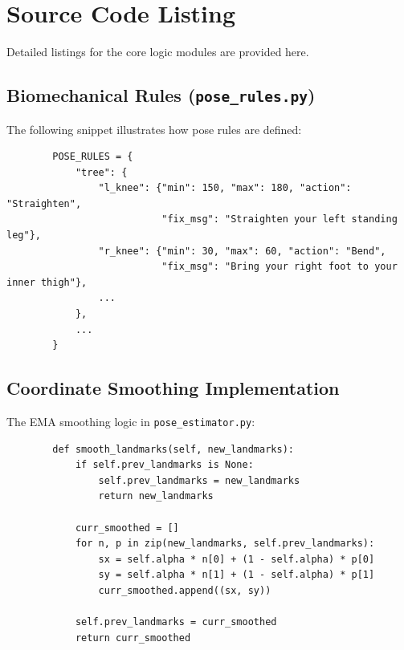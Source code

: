 \documentclass[a4paper, 11pt, oneside]{report}
\begin{document}
        \chapter{Source Code Listing}
        Detailed listings for the core logic modules are provided here.

        \section{Biomechanical Rules (\texttt{pose\_rules.py})}
        The following snippet illustrates how pose rules are defined:
        \begin{verbatim}
        POSE_RULES = {
            "tree": {
                "l_knee": {"min": 150, "max": 180, "action": "Straighten", 
                           "fix_msg": "Straighten your left standing leg"},
                "r_knee": {"min": 30, "max": 60, "action": "Bend", 
                           "fix_msg": "Bring your right foot to your inner thigh"},
                ...
            },
            ...
        }
        \end{verbatim}

        \section{Coordinate Smoothing Implementation}
        The EMA smoothing logic in \texttt{pose\_estimator.py}:
        \begin{verbatim}
        def smooth_landmarks(self, new_landmarks):
            if self.prev_landmarks is None:
                self.prev_landmarks = new_landmarks
                return new_landmarks
            
            curr_smoothed = []
            for n, p in zip(new_landmarks, self.prev_landmarks):
                sx = self.alpha * n[0] + (1 - self.alpha) * p[0]
                sy = self.alpha * n[1] + (1 - self.alpha) * p[1]
                curr_smoothed.append((sx, sy))
            
            self.prev_landmarks = curr_smoothed
            return curr_smoothed
        \end{verbatim}

        
	
        
	
	
	

	
\end{document}
